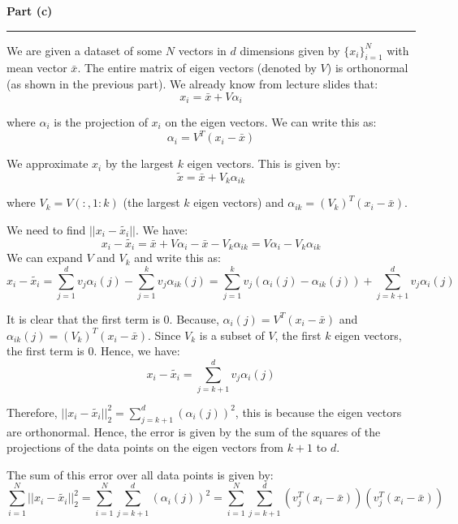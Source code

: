 \documentclass[a4paper,12pt]{article}
\newenvironment{solution}[2][]{%
    \begin{mdframed}[linecolor=blue!70!black, linewidth=2pt, roundcorner=10pt, backgroundcolor=yellow!10!white, skipabove=12pt, skipbelow=12pt]%
        \textbf{\large #2}
        \par\noindent\rule{\textwidth}{0.4pt}
}{
    \end{mdframed}
}
\begin{document}
\begin{solution}{Part (c)}
We are given a dataset of some $N$ vectors in $d$ dimensions given by $\{x_i\}_{i=1}^N$ with mean vector $\bar{x}$. The entire matrix of eigen vectors (denoted by $V$) is orthonormal (as shown in the previous part). We already know from lecture slides that:
\begin{equation}
  x_i = \bar{x} + V\alpha_i
\end{equation}

where $\alpha_i$ is the projection of $x_i$ on the eigen vectors. We can write this as:
\begin{equation}
  \alpha_i = V^T(x_i - \bar{x})
\end{equation}

We approximate $x_i$ by the largest $k$ eigen vectors. This is given by:
\begin{equation}
  \tilde{x} = \bar{x} + V_k\alpha_{ik}
\end{equation}

where $V_k = V(:,1:k)$ (the largest $k$ eigen vectors) and $\alpha_{ik} = (V_k)^T(x_i - \bar{x})$.


We need to find $||x_i-\tilde{x_i}||$. We have:
\begin{equation}
  x_i - \tilde{x_i} = \bar{x} + V\alpha_i - \bar{x} - V_k\alpha_{ik} = V\alpha_i - V_k\alpha_{ik}
\end{equation}
We can expand $V$ and $V_k$ and write this as:
\begin{equation}
  x_i - \tilde{x_i} = \sum_{j=1}^{d} v_j\alpha_i(j) - \sum_{j=1}^{k} v_j\alpha_{ik}(j) = \sum_{j=1}^k v_j(\alpha_i(j) - \alpha_{ik}(j)) + \sum_{j=k+1}^d v_j\alpha_i(j)
\end{equation}

It is clear that the first term is 0. Because, $\alpha_i(j) = V^T(x_i - \bar{x})$ and $\alpha_{ik}(j) = (V_k)^T(x_i - \bar{x})$. Since $V_k$ is a subset of $V$, the first $k$ eigen vectors, the first term is 0. Hence, we have:
\begin{equation}
  x_i - \tilde{x_i} = \sum_{j=k+1}^d v_j\alpha_i(j)
\end{equation}

Therefore, $||x_i-\tilde{x_i}||_2^2 = \sum_{j=k+1}^{d} (\alpha_i(j))^2$, this is because the eigen vectors are orthonormal. Hence, the error is given by the sum of the squares of the projections of the data points on the eigen vectors from $k+1$ to $d$.


The sum of this error over all data points is given by:
\begin{equation}
  \sum_{i=1}^{N} ||x_i-\tilde{x_i}||_2^2 = \sum_{i=1}^{N} \sum_{j=k+1}^{d} (\alpha_i(j))^2 = \sum_{i=1}^{N} \sum_{j=k+1}^{d} (v_j^T(x_i - \bar{x}))(v_j^T(x_i - \bar{x}))
\end{equation}


\end{solution}
\end{document}
